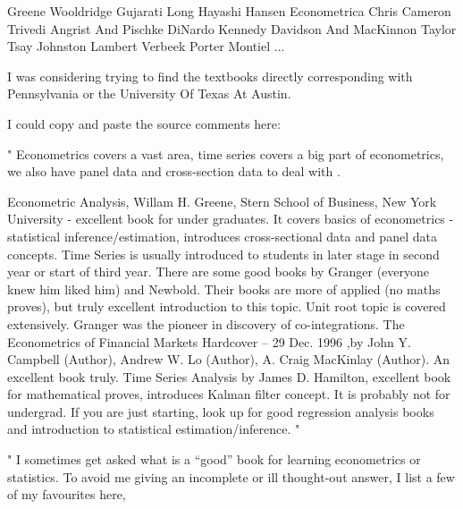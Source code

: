 Greene
Wooldridge
Gujarati
Long
Hayashi
Hansen
Econometrica
Chris
Cameron
Trivedi
Angrist And Pischke
DiNardo
Kennedy
Davidson And MacKinnon
Taylor
Tsay
Johnston
Lambert
Verbeek
Porter
Montiel
...

I was considering trying to find the textbooks directly corresponding with Pennsylvania or the University Of Texas At Austin.

I could copy and paste the source comments here:

"
Econometrics covers a vast area, time series covers a big part of econometrics, we also have panel data and cross-section data to deal with .

Econometric Analysis, Willam H. Greene, Stern School of Business, New York University - excellent book for under graduates. It covers basics of econometrics - statistical inference/estimation, introduces cross-sectional data and panel data concepts.
Time Series is usually introduced to students in later stage in second year or start of third year. There are some good books by Granger (everyone knew him liked him) and Newbold. Their books are more of applied (no maths proves), but truly excellent introduction to this topic. Unit root topic is covered extensively. Granger was the pioneer in discovery of co-integrations.
The Econometrics of Financial Markets Hardcover – 29 Dec. 1996 ,by John Y. Campbell (Author), Andrew W. Lo (Author), A. Craig MacKinlay (Author). An excellent book truly.
Time Series Analysis by James D. Hamilton, excellent book for mathematical proves, introduces Kalman filter concept. It is probably not for undergrad.
If you are just starting, look up for good regression analysis books and introduction to statistical estimation/inference.
"

"
I sometimes get asked what is a “good” book for learning econometrics or statistics. To avoid me giving an incomplete or ill thought-out answer, I list a few of my favourites here,

